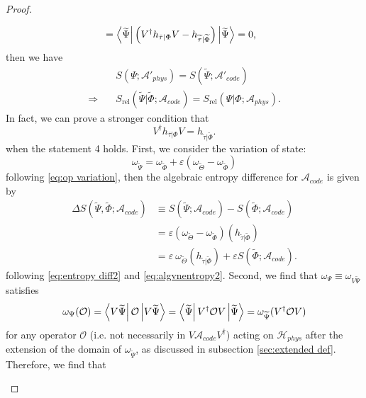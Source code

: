 \documentclass[a4paper,11pt]{article}
\newcommand{\diracprod}[3]{\left\langle  #1 \vphantom{#2#3} \right|#2 \left| #3 \vphantom{#1#2} \right\rangle } %
\renewcommand{\=}[1]{\stackrel{#1}{=}} %
\def\A{\mathcal{A}}
\def\O{\mathcal{O}}
\def\H{\mathcal{H}}
\def\Srel{S_{\text{rel}}}
\begin{document}
\begin{proof}
\begin{itemize}
\begin{equation}
\begin{aligned}
				&=\diracprod{\widetilde{\Psi} }{\left(V^\dagger h_{\bar{\tau }|\Phi}V-h_{\widetilde{\tau}|\widetilde{\Phi}}\right)}{\widetilde{\Psi}}=0,
			\end{aligned}
		\end{equation}
		then we have
		\begin{equation}
			\begin{aligned}
				&S(\Psi;\A'_{phys})=S(\widetilde{\Psi};\A'_{code})\\ \Rightarrow\quad &\Srel(\widetilde{\Psi}|\widetilde{\Phi};\A_{code})=\Srel(\Psi|\Phi;\A_{phys}).
			\end{aligned}
		\end{equation}
		In fact, we can prove a stronger condition that
		\begin{equation}
			V^\dagger h_{\bar{\tau }|\Phi}V=h_{\widetilde{\tau}|\widetilde{\Phi}}.
		\end{equation}
		when the statement 4 holds. First, we consider the variation of state:
		\begin{equation}
			\omega_{\widetilde{\Psi}}=\omega_{\widetilde{\Phi}}+\varepsilon(\omega_{\widetilde{\Theta}}-\omega_{\widetilde{\Phi}})
		\end{equation}
		following \eqref{eq:op variation}, then the algebraic entropy difference for $\A_{code}$ is given by
		\begin{equation}\label{eq:delta Scode}
			\begin{aligned}
				\Delta S(\widetilde{\Psi},\widetilde{\Phi};\A_{code})&\equiv S(\widetilde{\Psi};\A_{code})-S(\widetilde{\Phi};\A_{code})\\
				&=\varepsilon(\omega_{\widetilde{\Theta}}-\omega_{\widetilde{\Phi}})(h_{\widetilde{\tau}|\widetilde{\Phi}})\\
				&=\varepsilon~\omega_{\widetilde{\Theta}}(h_{\widetilde{\tau}|\widetilde{\Phi}})+\varepsilon S(\widetilde{\Phi};\A_{code}).
			\end{aligned}
		\end{equation}
		following \eqref{eq:entropy diff2} and \eqref{eq:algvnentropy2}. Second, we find that $\omega_{\Psi}\equiv\omega_{V\widetilde{\Psi}}$ satisfies
		\begin{equation}\label{eq:omegaV}
			\omega_{\Psi}(\O)=\diracprod{V\widetilde{\Psi}}{\O}{V\widetilde{\Psi}}=\diracprod{\widetilde{\Psi}}{V^\dagger\O V}{\widetilde{\Psi}}=\omega_{\widetilde{\Psi}}(V^\dagger\O V)
		\end{equation}
		for any operator $\O$ (i.e. not necessarily in $V\A_{code}V^\dagger$) acting on $\H_{phys}$ after the extension of the domain of $\omega_{\widetilde{\Psi}}$, as discussed in subsection \ref{sec:extended def}. Therefore, we find that

\end{itemize}
\end{proof}
\end{document}
